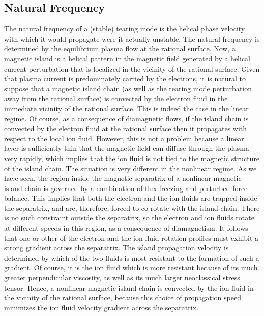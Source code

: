 \documentclass[12pt,prb,aps]{revtex4-1}
\begin{document}
\subsection{Natural Frequency}\label{natural}
The natural frequency of a (stable) tearing mode is
the helical phase velocity with which it would propagate
were it actually unstable.\cite{rfa} The natural frequency
is determined by the equilibrium plasma flow at the
rational surface. Now, a magnetic island is a helical
pattern in the magnetic field  generated by a helical current perturbation that is localized in the
vicinity of the rational surface.
Given that plasma current is predominately carried by the
electrons, it is natural to suppose that a magnetic
island chain (as well as the tearing mode perturbation
away from the rational surface)  is convected by the
electron fluid in the immediate vicinity of the rational
surface. This is indeed the case in the linear regime.\cite{ara} Of course, as a consequence of diamagnetic flows, if the island chain is
convected by the electron fluid at the rational surface then it propagates with respect to the local ion fluid. However, this is not a
problem because a linear layer is sufficiently thin that the magnetic field can diffuse through the plasma very rapidly, which implies that
the ion fluid is not tied to the magnetic structure of the island chain. The situation is very different in the nonlinear regime. 
As we have seen, the region inside the magnetic separatrix of a nonlinear magnetic island chain is governed by a combination of flux-freezing and perturbed force balance.
This implies that both the electron and the ion fluids are trapped inside the separatrix, and are, therefore,  forced to co-rotate with the island chain. There
is no such constraint outside the separatrix, so the electron and ion fluids rotate at different speeds in this region,
as a consequence of diamagnetism.  It follows that one or other of the electron and the ion fluid rotation profiles must exhibit a strong gradient across
the separatrix. The island propagation velocity is determined by which of the two fluids is most resistant to the formation of such a gradient. 
Of course, it is the ion fluid which is more resistant because of its much greater perpendicular viscosity,\cite{nl1,wat} as well as its much larger 
neoclassical stress tensor.\cite{nl2} Hence, a nonlinear magnetic island chain is convected by the ion fluid in the vicinity of the rational
surface, because this choice of propagation speed minimizes the ion fluid velocity gradient across the separatrix.
\end{document}
